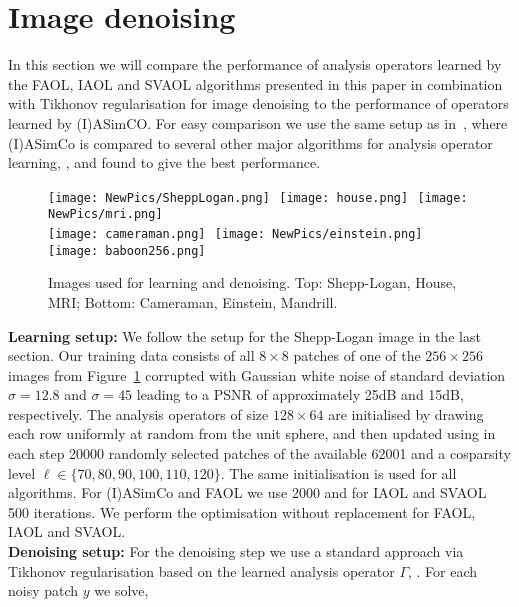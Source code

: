 \documentclass[11pt, onecolumn, journal,compsoc]{IEEEtran}
\theoremstyle{plain}
\theoremstyle{remark}
\begin{document}
\section{Image denoising}\label{sec:denoise}

In this section we will compare the performance of analysis operators learned by the FAOL, IAOL and SVAOL algorithms presented in this paper in combination with Tikhonov regularisation for image denoising to the performance of operators learned by (I)ASimCO. For easy comparison we use the same setup as in~\cite{dowadaplha16}, where (I)ASimCo is compared to several other major algorithms for analysis operator learning, \cite{rabr13, yanagrda13,hakldi13,rupeel13,ekba14}, and found to give the best performance. \\
\begin{figure}
	\centering 
	\texttt{[image: NewPics/SheppLogan.png]}\,\,
	\texttt{[image: house.png]}\,\,
	\texttt{[image: NewPics/mri.png]}\\\vspace{6pt}
	\texttt{[image: cameraman.png]}\,\,
	\texttt{[image: NewPics/einstein.png]}\,\,
	\texttt{[image: baboon256.png]}
	\caption{Images used for learning and denoising. Top: Shepp-Logan, House, MRI; Bottom: Cameraman, Einstein, Mandrill.}
	\label{fig:TrainingImages}
\end{figure}
{\bf Learning setup:} We follow the setup for the Shepp-Logan image in the last section. Our training data consists of all $8\times 8$ patches of one of the $256\times 256$ images from Figure~\ref{fig:TrainingImages} corrupted with Gaussian white noise of standard deviation $\sigma = 12.8$ and $\sigma = 45$ leading to a PSNR of approximately 25dB and 15dB, respectively. The analysis operators of size $128\times 64$ are initialised by drawing each row uniformly at random from the unit sphere, and then updated using in each step 20000 randomly selected patches of the available 62001 and a cosparsity level $\ell \in \{70,80,90,100,110,120\}$. The same initialisation is used for all algorithms. For (I)ASimCo and FAOL we use 2000 and for IAOL and SVAOL 500 iterations. We perform the optimisation without replacement for FAOL, IAOL and SVAOL. \\
{\bf Denoising setup:} For the denoising step we use a standard approach via Tikhonov regularisation based on the learned analysis operator $\Gamma$, \cite{elah06,elmiru07}. For each noisy patch $y$ we solve,
\end{document}
